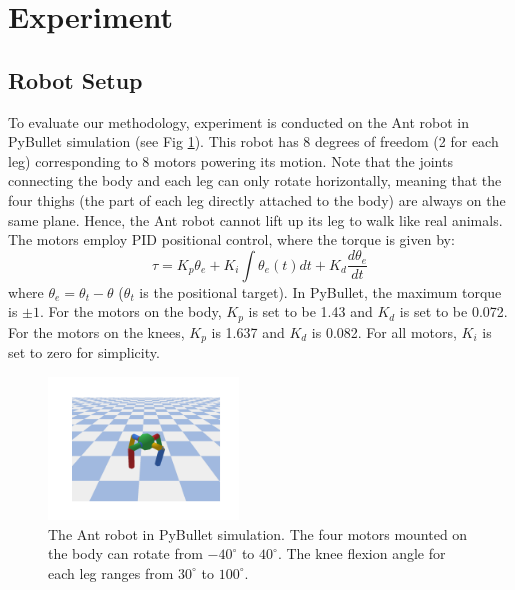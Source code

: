 \documentclass[journal]{IEEEtran}
\begin{document}
\section{Experiment}



\subsection{Robot Setup}
To evaluate our methodology, experiment is conducted on the Ant robot in PyBullet simulation \cite{PyBullet} (see Fig \ref{Ant_robot}). 
This robot has 8 degrees of freedom (2 for each leg) corresponding to 8 motors powering its motion.
Note that the joints connecting the body and each leg can only rotate horizontally, meaning that the four thighs (the part of each leg directly attached to the body) are always on the same plane.
Hence, the Ant robot cannot lift up its leg to walk like real animals.
The motors employ PID positional control, where the torque is given by:
\begin{equation}
\tau = K_p \theta_e + K_i \int \theta_e(t) dt + K_d \frac{d \theta_e}{dt}
\label{PID}
\end{equation}
where $\theta_e = \theta_t - \theta$ ($\theta_t$ is the positional target).
In PyBullet, the maximum torque is $\pm 1$. 
For the motors on the body, $K_p$ is set to be 1.43 and $K_d$ is set to be 0.072.
For the motors on the knees, $K_p$ is 1.637 and $K_d$ is 0.082.
For all motors, $K_i$ is set to zero for simplicity. 
\begin{figure}[h]
\centering
\includegraphics[width=0.45\textwidth]{intact_robot.pdf}
\caption{The Ant robot in PyBullet simulation. 
The four motors mounted on the body can rotate from $-40^{\circ}$ to $40^{\circ}$. The knee flexion angle for each leg ranges from 
$30^{\circ}$ to $100^{\circ}$.
}
\label{Ant_robot}
\end{figure}
\end{document}
